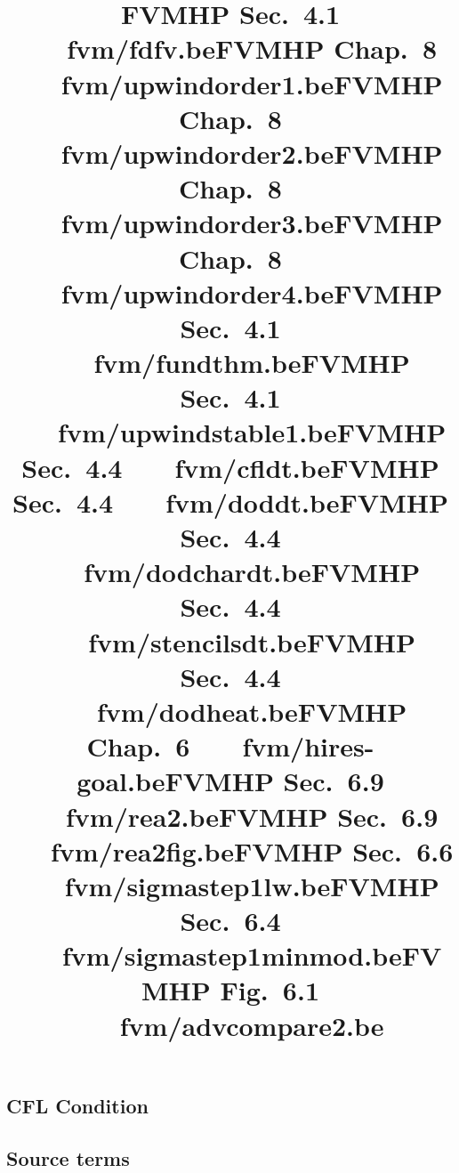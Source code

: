 \documentclass{beamer}
\newcommand{\mkslidelabel}[2]{\title{#2}}
\renewcommand{\mkslidelabel}[2]{\title{#2 ~~~#1}}
\begin{document}
\mkslidelabel{fvm/fdfv.be}{FVMHP Sec.\ 4.1}
\mkslidelabel{fvm/upwindorder1.be}{FVMHP Chap.\ 8}
\mkslidelabel{fvm/upwindorder2.be}{FVMHP Chap.\ 8}
\mkslidelabel{fvm/upwindorder3.be}{FVMHP Chap.\ 8}
\mkslidelabel{fvm/upwindorder4.be}{FVMHP Chap.\ 8}

\subsection{CFL Condition}
\mkslidelabel{fvm/fundthm.be}{FVMHP Sec.\ 4.1}
\mkslidelabel{fvm/upwindstable1.be}{FVMHP Sec.\ 4.1}
\mkslidelabel{fvm/cfldt.be}{FVMHP Sec.\ 4.4}
\mkslidelabel{fvm/doddt.be}{FVMHP Sec.\ 4.4}
\mkslidelabel{fvm/dodchardt.be}{FVMHP Sec.\ 4.4}
\mkslidelabel{fvm/stencilsdt.be}{FVMHP Sec.\ 4.4}
\mkslidelabel{fvm/dodheat.be}{FVMHP Sec.\ 4.4}

\mkslidelabel{fvm/hires-goal.be}{FVMHP Chap.\ 6}
\mkslidelabel{fvm/rea2.be}{FVMHP Sec.\ 6.9}
\mkslidelabel{fvm/rea2fig.be}{FVMHP Sec.\ 6.9}
\mkslidelabel{fvm/sigmastep1lw.be}{FVMHP Sec.\ 6.6}
\mkslidelabel{fvm/sigmastep1minmod.be}{FVMHP Sec.\ 6.4}
\mkslidelabel{fvm/advcompare2.be}{FVMHP Fig.\ 6.1}


\subsection{Source terms}
\end{document}
